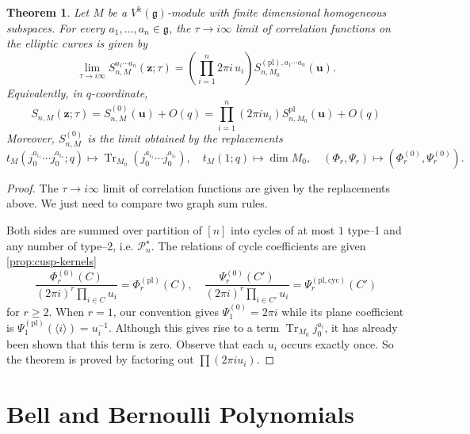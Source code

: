 \documentclass[11pt,a4paper]{amsart}
\numberwithin{equation}{section}
\newtheorem{theorem}{Theorem}[section]
\theoremstyle{definition}
\theoremstyle{remark}
\DeclareMathOperator{\Tr}{Tr}
\newcommand{\g}{\mathfrak g}
\newcommand{\kk}{\Bbbk}
\newcommand{\ii}{i}
\newcommand{\cP}{\mathcal P}
\newcommand{\zbf}{\boldsymbol z}
\newcommand{\ubf}{\boldsymbol u}
\begin{document}
\begin{theorem}
\label{thm:cusp-cycle-formula}
Let $M$ be a $V^{\kk}(\g)$-module with finite dimensional homogeneous subspaces. For every $a_1,\ldots,a_n\in\g$,  the $\tau\to i\infty$ limit of correlation functions on the elliptic curves is given by
\begin{equation}
\lim_{\tau\to\ii\infty}S_{n,M}^{a_1\cdots a_n}(\zbf;\tau)
 =\left(\prod_{i=1}^n2\pi\ii\,u_i\right)
 S_{n,M_0}^{(\mathrm{pl}),a_1\cdots a_n}(\ubf).
 \label{eq:cusp-plane-trace-limit}
\end{equation}
Equivalently, in $q$-coordinate,
\begin{equation}
 S_{n,M}(\zbf;\tau)=S_{n,M}^{(0)}(\ubf)+O(q)=\prod_{i=1}^n (2\pi\ii u_i)S_{n,M_0}^{\mathrm{pl}}(\ubf)+O(q)
 \label{eq:normalized-cusp-trace}
\end{equation}
Moreover, $S_{n,M}^{(0)}$ is the limit obtained by the replacements
\begin{equation}
 t_M(j_0^{a_{i_1}}\cdots j_0^{a_{i_r}};q)
 \longmapsto
 \Tr_{M_0}(j_0^{a_{i_1}}\cdots j_0^{a_{i_r}}),
 \quad
 t_M(1;q)\longmapsto\dim M_0,
 \quad
 (\Phi_r,\Psi_r)\longmapsto
 (\Phi_r^{(0)},\Psi_r^{(0)}).
 \label{eq:cusp-replacements}
\end{equation}
\end{theorem}
\begin{proof}
The $\tau \to i\infty$ limit of correlation functions are given by the replacements above. We just need to compare two graph sum rules.

Both sides are summed over partition of $\left[n\right]$ into cycles of at most $1$ type--1 and any number of type--2, i.e. $\cP_n^{\star}$. The relations of cycle coefficients are given \cref{prop:cusp-kernels}
\begin{equation*}
 \frac{\Phi_r^{(0)}(C)}
 {(2\pi\ii)^r\prod_{i\in C}u_i}
 =\Phi_r^{(\mathrm{pl})}(C),
 \quad
 \frac{\Psi_r^{(0)}(C')}
 {(2\pi\ii)^r\prod_{i\in C'}u_i}
 =\Psi_r^{(\mathrm{pl,cyc})}(C')
\end{equation*}
for $r\geq 2$. When $r=1$, our convention gives $\Psi_1^{(0)}=2\pi\ii$ while its plane coefficient is $\Psi_1^{(\mathrm{pl})}(\langle i\rangle)=u_i^{-1}$. Although this gives rise to a term $\Tr_{M_0}j_0^{a_i}$, it has already been shown that this term is zero.
Observe that each $u_i$  occurs exactly once. So the theorem is proved by factoring out $\prod (2\pi \ii u_i)$.
\end{proof}

\appendix
\section{Bell and Bernoulli Polynomials}
\label{app:combinatorics}
\end{document}
